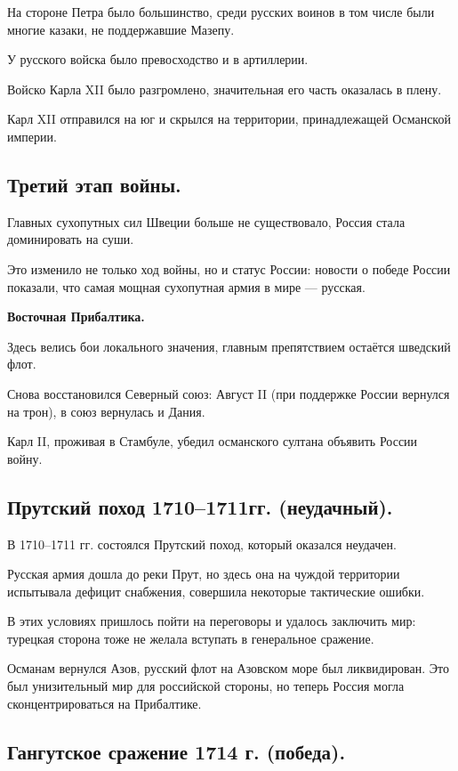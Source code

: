 На стороне Петра было большинство, среди русских воинов в том числе были многие казаки, не поддержавшие Мазепу. 

У русского войска было превосходство и в артиллерии.

Войско Карла XII было разгромлено, значительная его часть оказалась в плену. 

Карл XII отправился на юг и скрылся на территории, принадлежащей Османской империи.

\subsection{Третий этап войны.}

Главных сухопутных сил Швеции больше не существовало, Россия стала доминировать на суши. 

Это изменило не только ход войны, но и статус России: новости о победе России показали, что самая мощная сухопутная армия в мире — русская.

\textbf{Восточная Прибалтика.} 

Здесь велись бои локального значения, главным препятствием остаётся шведский флот. 

Снова восстановился Северный союз: Август II (при поддержке России вернулся на трон), в союз вернулась и Дания.

Карл II, проживая в Стамбуле, убедил османского султана объявить России войну.

\subsection{Прутский поход 1710--1711гг. (неудачный).}

В 1710--1711 гг. состоялся Прутский поход, который оказался неудачен. 

Русская армия дошла до реки Прут, но здесь она на чуждой территории испытывала дефицит снабжения, совершила некоторые тактические ошибки. 

В этих условиях пришлось пойти на переговоры и удалось заключить мир: турецкая сторона тоже не желала вступать в генеральное сражение. 

Османам вернулся Азов, русский флот на Азовском море был ликвидирован. Это был унизительный мир для российской стороны, но теперь Россия могла сконцентрироваться на Прибалтике.

\subsection{Гангутское сражение 1714 г. (победа).}

